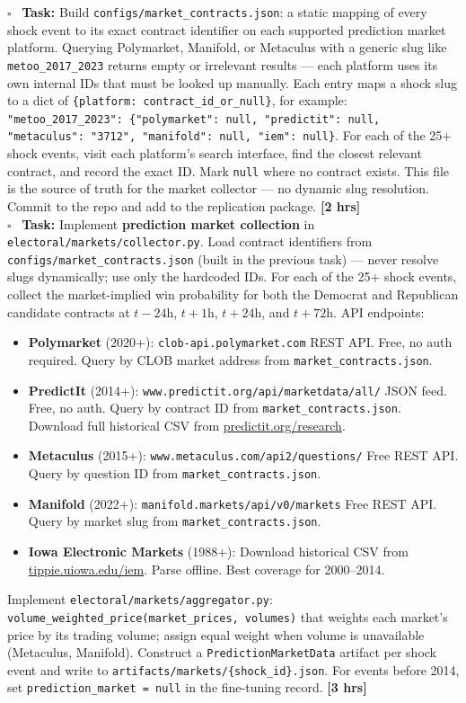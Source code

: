 \documentclass[11pt]{article}
\newcommand{\hrs}[1]{\textbf{[#1 hrs]}}
\newcommand{\task}[2]{%
  \noindent\textbf{Task:} #1 \hfill \hrs{#2}\\}
\newcommand{\done}{\textcolor{sectionblue}{$\square$}\ }
\begin{document}
\begin{taskbox}
\done \task{Build \texttt{configs/market\_contracts.json}: a static mapping
  of every shock event to its exact contract identifier on each supported
  prediction market platform. Querying Polymarket, Manifold, or Metaculus
  with a generic slug like \texttt{metoo\_2017\_2023} returns empty or
  irrelevant results --- each platform uses its own internal IDs that must
  be looked up manually. Each entry maps a shock slug to a dict of
  \texttt{\{platform: contract\_id\_or\_null\}}, for example:
  \texttt{"metoo\_2017\_2023": \{"polymarket": null, "predictit": null,
  "metaculus": "3712", "manifold": null, "iem": null\}}.
  For each of the 25+ shock events, visit each platform's search interface,
  find the closest relevant contract, and record the exact ID. Mark
  \texttt{null} where no contract exists. This file is the source of truth
  for the market collector --- no dynamic slug resolution. Commit to the repo
  and add to the replication package.}{2}

\done \task{Implement \textbf{prediction market collection} in
  \texttt{electoral/markets/collector.py}. Load contract identifiers from
  \texttt{configs/market\_contracts.json} (built in the previous task) ---
  never resolve slugs dynamically; use only the hardcoded IDs. For each
  of the 25+ shock events, collect the market-implied win probability for
  both the Democrat and Republican candidate contracts at $t - 24$h,
  $t + 1$h, $t + 24$h, and $t + 72$h. API endpoints:
  \begin{itemize}[leftmargin=1.6em, itemsep=1pt]
    \item \textbf{Polymarket} (2020+): \texttt{clob-api.polymarket.com} REST API.
          Free, no auth required. Query by CLOB market address from
          \texttt{market\_contracts.json}.
    \item \textbf{PredictIt} (2014+): \texttt{www.predictit.org/api/marketdata/all/}
          JSON feed. Free, no auth. Query by contract ID from
          \texttt{market\_contracts.json}. Download full historical CSV from
          \url{predictit.org/research}.
    \item \textbf{Metaculus} (2015+): \texttt{www.metaculus.com/api2/questions/}
          Free REST API. Query by question ID from \texttt{market\_contracts.json}.
    \item \textbf{Manifold} (2022+): \texttt{manifold.markets/api/v0/markets}
          Free REST API. Query by market slug from \texttt{market\_contracts.json}.
    \item \textbf{Iowa Electronic Markets} (1988+): Download historical CSV from
          \url{tippie.uiowa.edu/iem}. Parse offline. Best coverage for 2000--2014.
  \end{itemize}
  Implement \texttt{electoral/markets/aggregator.py}:
  \texttt{volume\_weighted\_price(market\_prices, volumes)} that weights each
  market's price by its trading volume; assign equal weight when volume is
  unavailable (Metaculus, Manifold). Construct a
  \texttt{PredictionMarketData} artifact per shock event and write to
  \texttt{artifacts/markets/\{shock\_id\}.json}. For events before 2014,
  set \texttt{prediction\_market = null} in the fine-tuning record.}{3}


\end{taskbox}
\end{document}
